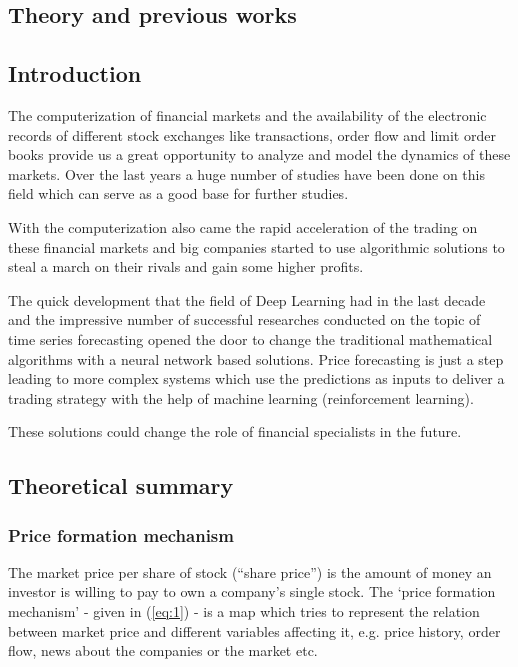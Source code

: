 \documentclass[11pt,a4paper,oneside]{article}
\begin{document}
\begin{center}
  \section{Theory and previous works}
  \label{sec:theory_prev}
\end{center}
\subsection{Introduction}
\label{sec:introduction}

The computerization of financial markets and the availability of the electronic records of different stock exchanges 
like transactions, order flow and limit order books provide us a great opportunity to analyze and model the dynamics of 
these markets. Over the last years a huge number of studies have been done on this field which can serve as a good base 
for further studies.

With the computerization also came the rapid acceleration of the trading on these financial markets and big companies 
started to use algorithmic solutions to steal a march on their rivals and gain some higher profits.

The quick development that the field of Deep Learning had in the last decade and the impressive number of successful 
researches conducted on the topic of time series forecasting opened the door to change the traditional mathematical 
algorithms with a neural network based solutions. Price forecasting is just a step leading to more complex systems 
which use the predictions as inputs to deliver a trading strategy with the help of machine learning 
(reinforcement learning).

These solutions could change the role of financial specialists in the future.

\subsection{Theoretical summary}
\label{sec:theoretical_summary}

  \subsubsection{Price formation mechanism}
  \label{sec:price_formation_mechanism}
  
  The market price per share of stock (“share price”) is the amount of money an investor is willing to pay to own 
  a company's single stock. The ‘price formation mechanism’ - given in (\ref{eq:1}) - is a map which tries to represent 
  the relation between market price and different variables affecting it, e.g. price history, order flow, news about 
  the companies or the market etc.
\end{document}
